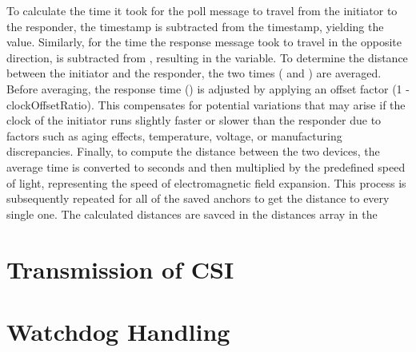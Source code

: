 To calculate the time it took for the poll message to travel from the initiator to the responder, the  timestamp is subtracted from the  timestamp, yielding the  value. Similarly, for the time the response message took to travel in the opposite direction,  is subtracted from , resulting in the  variable.
\vspace{4pt}
\newline
To determine the distance between the initiator and the responder, the two times ( and ) are averaged. Before averaging, the response time () is adjusted by applying an offset factor (1 - clockOffsetRatio). This compensates for potential variations that may arise if the clock of the initiator runs slightly faster or slower than the responder due to factors such as aging effects, temperature, voltage, or manufacturing discrepancies.
\vspace{4pt}
\newline
Finally, to compute the distance between the two devices, the average time is converted to seconds and then multiplied by the predefined speed of light, representing the speed of electromagnetic field expansion.
\vspace{4pt}
\newline
This process is subsequently repeated for all of the saved anchors to get the distance to every single one. 
The calculated distances are savced in the distances array in the 



\section{Transmission of CSI}

\section{Watchdog Handling}


